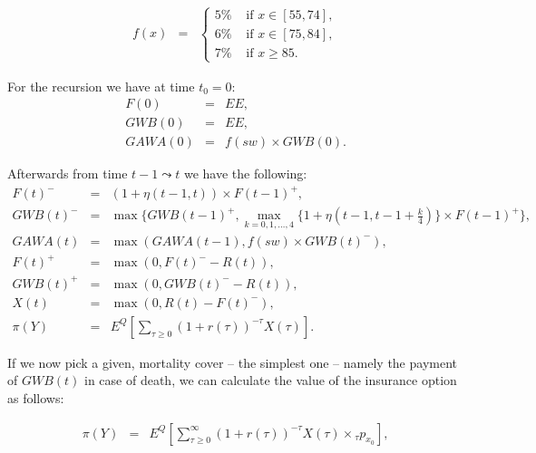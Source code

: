 \documentclass[10pt, a4paper,landscape]{article}
\begin{document}
\begin{eqnarray*}
f(x) &=& \left\{ 
\begin{array}{cc}
5 \% & \mbox{ if } x \in [55,74], \\
6 \% & \mbox{ if } x \in [75,84], \\
7 \% & \mbox{ if } x \ge 85.
\end{array} \right.
\end{eqnarray*}

For the recursion we have at time $t_0=0$:
\begin{eqnarray*}
F(0)   & = & EE, \\
GWB(0)   & = & EE, \\
GAWA(0)& = & f(sw) \times GWB(0) .
\end{eqnarray*}

Afterwards from time $t-1 \leadsto t$ we have the following:
\begin{eqnarray*}
F(t)^- &= & (1 + \eta(t-1,t)) \times F(t-1)^+, \\
GWB(t)^- & = & \max\{ GWB(t-1)^+,\max_{k=0,1,\dots, 4} \{1 + \eta(t-1,t-1 + \frac{k}{4})  \} \times F(t-1)^+\},\\
GAWA(t) & = & \max(GAWA(t-1), f(sw) \times GWB(t)^-) ,\\ 
F(t)^+ & = & \max(0, F(t)^- - R(t)), \\
GWB(t)^+ & = & \max(0, GWB(t)^- - R(t)), \\
X(t) & = & \max(0,R(t) - F(t)^-), \\[1ex] %
\pi(Y) & = & E^{Q}\left[\sum_{\tau \ge 0} (1+r(\tau))^{-\tau} X(\tau)  \right].
\end{eqnarray*}


If we now pick a given, mortality cover -- the simplest one -- namely the payment of $GWB(t)$ in case of death, we can calculate the value of the insurance option as follows:

\begin{eqnarray*}
\pi(Y) & = & E^Q\left[\sum\limits_{\tau \ge 0}^{\infty} (1+r(\tau))^{-\tau} X(\tau) \times {}_{\tau} p_{x_0} \right],
\end{eqnarray*}
\end{document}

